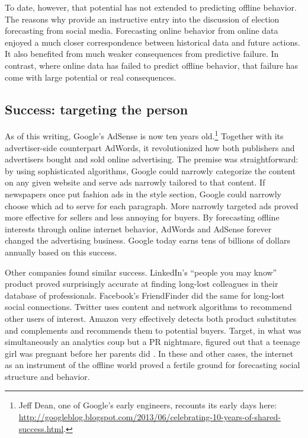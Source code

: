 \documentclass{article}
\begin{document}
To date, however, that potential has not extended to predicting
offline behavior. The reasons why provide an instructive entry into
the discussion of election forecasting from social media. Forecasting
online behavior from online data enjoyed a much closer correspondence
between historical data and future actions. It also benefited from
much weaker consequences from predictive failure. In contrast, where
online data has failed to predict offline behavior, that failure has
come with large potential or real consequences. 


\subsection{Success: targeting the person}
\label{sec:targeting-person}


As of this writing, Google's AdSense is now ten years
old.\footnote{Jeff Dean, one of Google's early engineers, recounts its
early days here:
\url{http://googleblog.blogspot.com/2013/06/celebrating-10-years-of-shared-success.html}.}
Together with its advertiser-side counterpart AdWords, it
revolutionized how both publishers and advertisers bought and sold
online advertising. The premise was straightforward: by using
sophisticated algorithms, Google could narrowly categorize the content
on any given website and serve ads narrowly tailored to that
content. If newspapers once put fashion ads in the style section,
Google could narrowly choose which ad to serve for each
paragraph. More narrowly targeted ads proved more effective for sellers
and less annoying for buyers. By forecasting offline interests through
online internet behavior, AdWords and AdSense forever changed the
advertising business. Google today earns tens of billions of dollars
annually based on this success.

Other companies found similar success. LinkedIn's ``people you may
know'' product proved surprisingly accurate at finding long-lost
colleagues in their database of professionals. Facebook's FriendFinder
did the same for long-lost social connections. Twitter uses content
and network algorithms to recommend other users of interest. Amazon
very effectively detects both product substitutes and complements and
recommends them to potential buyers. Target, in what was
simultaneously an analytics coup but a PR nightmare, figured out that
a teenage girl was pregnant before her parents did
\citep{hill2012}. In these and other cases, the internet as an
instrument of the offline world proved a fertile ground for
forecasting social structure and behavior.
\end{document}

